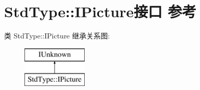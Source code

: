 \hypertarget{interface_std_type_1_1_i_picture}{}\section{Std\+Type\+:\+:I\+Picture接口 参考}
\label{interface_std_type_1_1_i_picture}
类 Std\+Type\+:\+:I\+Picture 继承关系图\+:\begin{figure}[H]
\begin{center}
\leavevmode
\includegraphics[height=2.000000cm]{interface_std_type_1_1_i_picture}
\end{center}
\end{figure}
